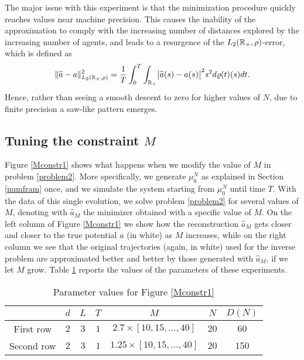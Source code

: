 The major issue with this experiment is that the minimization procedure quickly reaches values near machine precision. This causes the inability of the approximation to comply with the increasing number of distances explored by the increasing number of agents, and leads to a resurgence of the $L_2(\mathbb{R}_+,\rho)$-error, which is defined as
\begin{align}
	\|\widehat a-a\|^2_{L_2(\mathbb{R}_+,\rho)} = \frac{1}{T}\int_0^T\int_{\mathbb{R}_+}\bigl|\widehat a(s)-a(s)\bigr|^2 s^2 d\varrho(t)(s) dt.
\end{align}
Hence, rather than seeing a smooth descent to zero for higher values of $N$, due to finite precision a saw-like pattern emerges.

\subsection{Tuning the constraint $M$}

Figure \ref{Mconstr1} shows what happens when we modify the value of $M$ in problem \eqref{problem2}. More specifically, we generate $\mu^N_0$ as explained in Section \ref{numfram} once, and we simulate the system starting from $\mu^N_0$ until time $T$. With the data of this single evolution, we solve problem \eqref{problem2} for several values of $M$, denoting with $\widehat{a}_M$ the minimizer obtained with a specific value of $M$. On the left column of Figure \ref{Mconstr1} we show how the reconstruction $\widehat{a}_M$ gets closer and closer to the true potential $a$ (in white) as $M$ increases, while on the right column we see that the original trajectories (again, in white) used for the inverse problem are approximated better and better by those generated with $\widehat{a}_M$, if we let $M$ grow. Table \ref{tab:figM} reports the values of the parameters of these experiments.

\begin{table}[h]
\begin{center}
\begin{tabular}{ |c|c|c|c|c|c|c| }
\hline
 & $d$ & $L$ & $T$ & $M$ & $N$ & $D(N)$ \\
\hline
\hline
 First row & $2$ & $3$ & $1$ & $2.7 \times [10,15,\ldots,40]$ & $20$ & $60$ \\
\hline
 Second row & $2$ & $3$ & $1$ & $1.25 \times [10,15,\ldots,40]$ & $20$ & $150$ \\
\hline
\end{tabular}
\end{center}
\vspace{-0.5cm}
\caption{Parameter values for Figure \ref{Mconstr1}} \label{tab:figM} 
\end{table}

